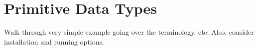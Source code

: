 \newpage
\section{Primitive Data Types}
Walk through very simple example going over the terminology, etc.  Also, consider installation and running options.